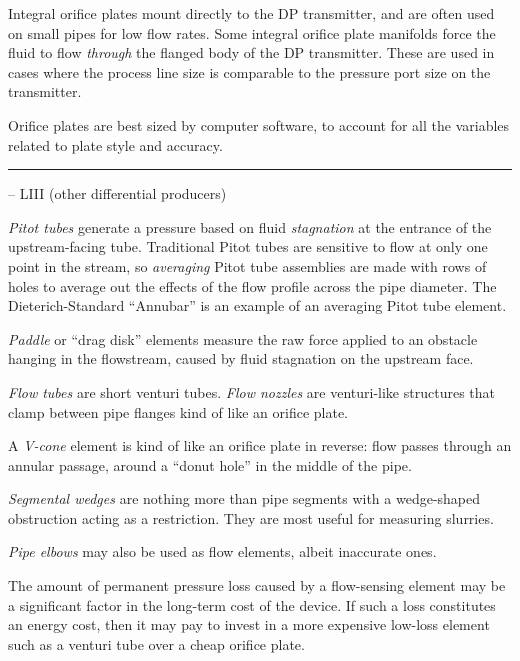 \vskip 10pt

Integral orifice plates mount directly to the DP transmitter, and are often used on small pipes for low flow rates.  Some integral orifice plate manifolds force the fluid to flow {\it through} the flanged body of the DP transmitter.  These are used in cases where the process line size is comparable to the pressure port size on the transmitter.

\vskip 10pt

Orifice plates are best sized by computer software, to account for all the variables related to plate style and accuracy.


\filbreak \vskip 5pt \hrule \vskip 5pt  -- LIII (other differential producers) \vskip 10pt

{\it Pitot tubes} generate a pressure based on fluid {\it stagnation} at the entrance of the upstream-facing tube.  Traditional Pitot tubes are sensitive to flow at only one point in the stream, so {\it averaging} Pitot tube assemblies are made with rows of holes to average out the effects of the flow profile across the pipe diameter.  The Dieterich-Standard ``Annubar'' is an example of an averaging Pitot tube element.

\vskip 10pt

{\it Paddle} or ``drag disk'' elements measure the raw force applied to an obstacle hanging in the flowstream, caused by fluid stagnation on the upstream face.

\vskip 10pt

{\it Flow tubes} are short venturi tubes.  {\it Flow nozzles} are venturi-like structures that clamp between pipe flanges kind of like an orifice plate.

\vskip 10pt

A {\it V-cone} element is kind of like an orifice plate in reverse: flow passes through an annular passage, around a ``donut hole'' in the middle of the pipe.

\vskip 10pt

{\it Segmental wedges} are nothing more than pipe segments with a wedge-shaped obstruction acting as a restriction.  They are most useful for measuring slurries.

\vskip 10pt

{\it Pipe elbows} may also be used as flow elements, albeit inaccurate ones.

\vskip 10pt

The amount of permanent pressure loss caused by a flow-sensing element may be a significant factor in the long-term cost of the device.  If such a loss constitutes an energy cost, then it may pay to invest in a more expensive low-loss element such as a venturi tube over a cheap orifice plate.



